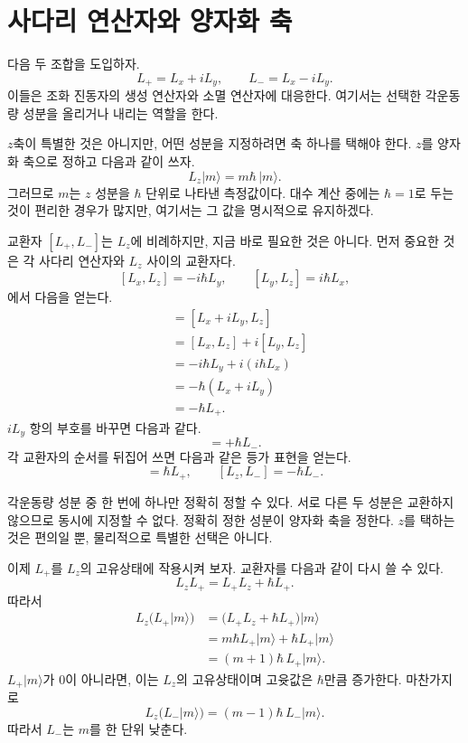 \section{사다리 연산자와 양자화 축}

다음 두 조합을 도입하자.\begin{equation}
L_+=L_x+iL_y,
\qquad
L_-=L_x-iL_y.
\end{equation}이들은 조화 진동자의 생성 연산자와 소멸 연산자에 대응한다. 여기서는 선택한 각운동량 성분을 올리거나 내리는 역할을 한다.

\(z\)축이 특별한 것은 아니지만, 어떤 성분을 지정하려면 축 하나를 택해야 한다. \(z\)를 양자화 축으로 정하고 다음과 같이 쓰자.\begin{equation}
L_z\lvert m\rangle=m\hbar\,\lvert m\rangle.
\end{equation}그러므로 \(m\)는 \(z\) 성분을 \(\hbar\) 단위로 나타낸 측정값이다. 대수 계산 중에는 \(\hbar=1\)로 두는 것이 편리한 경우가 많지만, 여기서는 그 값을 명시적으로 유지하겠다.

교환자 \([L_+,L_-]\)는 \(L_z\)에 비례하지만, 지금 바로 필요한 것은 아니다. 먼저 중요한 것은 각 사다리 연산자와 \(L_z\) 사이의 교환자다.\[
[L_x,L_z]=-i\hbar L_y,
\qquad
[L_y,L_z]=i\hbar L_x,
\]에서 다음을 얻는다.\begin{align}
[L_+,L_z]
&=[L_x+iL_y,L_z] \\
&=[L_x,L_z]+i[L_y,L_z] \\
&=-i\hbar L_y+i(i\hbar L_x) \\
&=-\hbar(L_x+iL_y) \\
&=-\hbar L_+.
\end{align}\(iL_y\) 항의 부호를 바꾸면 다음과 같다.\begin{equation}
[L_-,L_z]=+\hbar L_-.
\end{equation}각 교환자의 순서를 뒤집어 쓰면 다음과 같은 등가 표현을 얻는다.\begin{equation}
[L_z,L_+]=\hbar L_+,
\qquad
[L_z,L_-]=-\hbar L_-.
\end{equation}

각운동량 성분 중 한 번에 하나만 정확히 정할 수 있다. 서로 다른 두 성분은 교환하지 않으므로 동시에 지정할 수 없다. 정확히 정한 성분이 양자화 축을 정한다. \(z\)를 택하는 것은 편의일 뿐, 물리적으로 특별한 선택은 아니다.

이제 \(L_+\)를 \(L_z\)의 고유상태에 작용시켜 보자. 교환자를 다음과 같이 다시 쓸 수 있다.
\begin{equation}
L_zL_+=L_+L_z+\hbar L_+.
\end{equation}
따라서
\begin{align}
L_z\bigl(L_+\lvert m\rangle\bigr)
&=\bigl(L_+L_z+\hbar L_+\bigr)\lvert m\rangle \\
&=m\hbar L_+\lvert m\rangle+\hbar L_+\lvert m\rangle \\
&=(m+1)\hbar\,L_+\lvert m\rangle.
\end{align}
\(L_+\lvert m\rangle\)가 0이 아니라면, 이는 \(L_z\)의 고유상태이며 고윳값은 \(\hbar\)만큼 증가한다. 마찬가지로
\begin{equation}
L_z\bigl(L_-\lvert m\rangle\bigr)
=(m-1)\hbar\,L_-\lvert m\rangle.
\end{equation}
따라서 \(L_-\)는 \(m\)를 한 단위 낮춘다.

